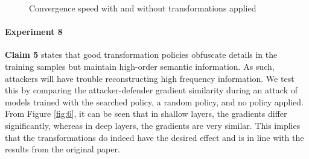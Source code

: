 \begin{figure}[h]
    \centering
    
    \caption{Convergence speed with and without transformations applied}
    \label{fig:3}
\end{figure}
\paragraph{Experiment 8}

\textbf{Claim 5} states that good transformation policies obfuscate details in the training samples but maintain high-order semantic information. As such, attackers will have trouble reconstructing high frequency information. We test this by comparing the attacker-defender gradient similarity during an attack of models trained with the searched policy, a random policy, and no policy applied. From Figure \ref{fig:6}, it can be seen that in shallow layers, the gradients differ significantly, whereas in deep layers, the gradients are very similar. This implies that the transformations do indeed have the desired effect and is in line with the results from the original paper.

